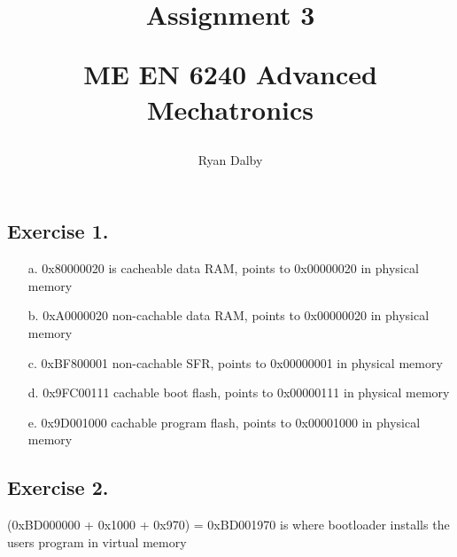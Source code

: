 \documentclass[12pt]{article}
\title{
    Assignment 3 

    \large{
        ME EN 6240 Advanced Mechatronics
    }  
}
\author{
        Ryan Dalby
}
\date{\displaydate{date}}
\begin{document}
\maketitle



\subsection*{Exercise 1.}
\begin{itemize}
    \item [a.] 
    0x80000020 is cacheable data RAM, points to 0x00000020 in physical memory

    \item [b.] 
    0xA0000020 non-cachable data RAM, points to 0x00000020 in physical memory

    \item [c.] 
    0xBF800001 non-cachable SFR, points to 0x00000001 in physical memory

    \item [d.] 
    0x9FC00111 cachable boot flash, points to 0x00000111 in physical memory 

    \item [e.] 
    0x9D001000 cachable program flash, points to 0x00001000 in physical memory

\end{itemize}

\subsection*{Exercise 2.}
(0xBD000000 + 0x1000 + 0x970) = 0xBD001970 is where bootloader installs the users program in virtual memory
\end{document}

